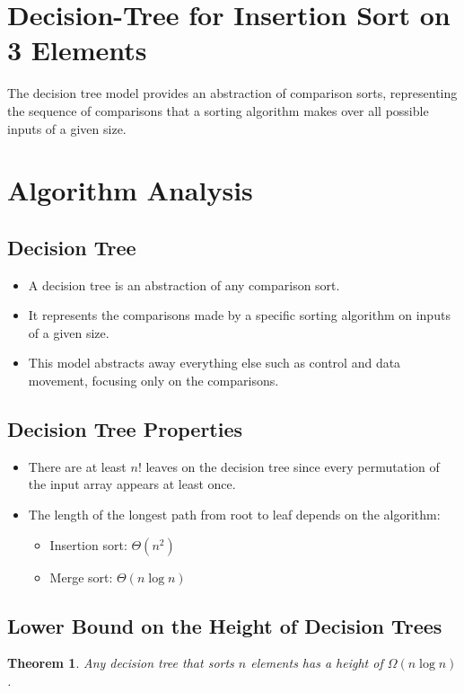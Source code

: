 \documentclass[12pt,openany]{book}
\newtheorem{theorem}{Theorem}[chapter]
\theoremstyle{definition}
\begin{document}
\section{Decision-Tree for Insertion Sort on 3 Elements}

The decision tree model provides an abstraction of comparison sorts, representing the sequence of comparisons that a sorting algorithm makes over all possible inputs of a given size.

\section{Algorithm Analysis}

\subsection{Decision Tree}
\begin{itemize}
	\item A decision tree is an abstraction of any comparison sort.
	\item It represents the comparisons made by a specific sorting algorithm on inputs of a given size.
	\item This model abstracts away everything else such as control and data movement, focusing only on the comparisons.
\end{itemize}

\subsection{Decision Tree Properties}
\begin{itemize}
	\item There are at least \( n! \) leaves on the decision tree since every permutation of the input array appears at least once.
	\item The length of the longest path from root to leaf depends on the algorithm:
	\begin{itemize}
		\item Insertion sort: \( \Theta(n^2) \)
		\item Merge sort: \( \Theta(n \log n) \)
	\end{itemize}
\end{itemize}

\subsection{Lower Bound on the Height of Decision Trees}
\begin{theorem}
	Any decision tree that sorts \( n \) elements has a height of \( \Omega(n \log n) \).
\end{theorem}
\end{document}

